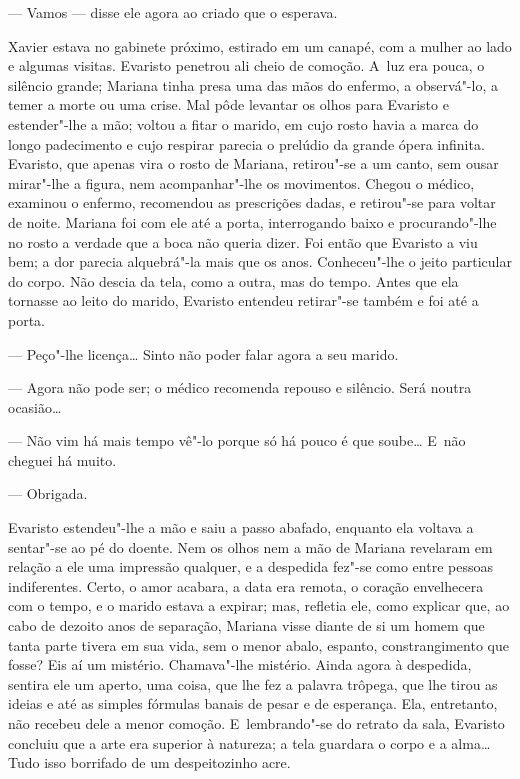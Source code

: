 \begin{linenumbers}
--- Vamos --- disse ele agora ao criado que o esperava.

Xavier estava no gabinete próximo, estirado em um canapé, com a mulher
ao lado e algumas visitas. Evaristo penetrou ali cheio de comoção. A~luz
era pouca, o silêncio grande; Mariana tinha presa uma das mãos do
enfermo, a observá"-lo, a temer a morte ou uma crise. Mal pôde levantar
os olhos para Evaristo e estender"-lhe a mão; voltou a fitar o marido, em
cujo rosto havia a marca do longo padecimento e cujo respirar parecia o
prelúdio da grande ópera infinita. Evaristo, que apenas vira o rosto de
Mariana, retirou"-se a um canto, sem ousar mirar"-lhe a figura, nem
acompanhar"-lhe os movimentos. Chegou o médico, examinou o enfermo,
recomendou as prescrições dadas, e retirou"-se para voltar de noite.
Mariana foi com ele até a porta, interrogando baixo e procurando"-lhe no
rosto a verdade que a boca não queria dizer. Foi então que Evaristo a
viu bem; a dor parecia alquebrá"-la mais que os anos. Conheceu"-lhe o
jeito particular do corpo. Não descia da tela, como a outra, mas do
tempo. Antes que ela tornasse ao leito do marido, Evaristo entendeu
retirar"-se também e foi até a porta.

--- Peço"-lhe licença\ldots{} Sinto não poder falar agora a seu marido.

--- Agora não pode ser; o médico recomenda repouso e silêncio. Será
noutra ocasião\ldots{}

--- Não vim há mais tempo vê"-lo porque só há pouco é que soube\ldots{} E~não
cheguei há muito.

--- Obrigada.

Evaristo estendeu"-lhe a mão e saiu a passo abafado, enquanto ela voltava
a sentar"-se ao pé do doente. Nem os olhos nem a mão de Mariana revelaram
em relação a ele uma impressão qualquer, e a despedida fez"-se como entre
pessoas indiferentes. Certo, o amor acabara, a data era remota, o
coração envelhecera com o tempo, e o marido estava a expirar; mas,
refletia ele, como explicar que, ao cabo de dezoito anos de separação,
Mariana visse diante de si um homem que tanta parte tivera em sua vida,
sem o menor abalo, espanto, constrangimento que fosse? Eis aí um
mistério. Chamava"-lhe mistério. Ainda agora à despedida, sentira ele um
aperto, uma coisa, que lhe fez a palavra trôpega, que lhe tirou as
ideias e até as simples fórmulas banais de pesar e de esperança. Ela,
entretanto, não recebeu dele a menor comoção. E~lembrando"-se do retrato
da sala, Evaristo concluiu que a arte era superior à natureza; a tela
guardara o corpo e a alma\ldots{} Tudo isso borrifado de um despeitozinho
acre.


\end{linenumbers}
